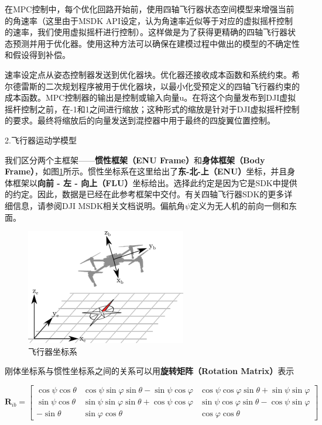 在MPC控制中，每个优化回路开始前，使用四轴飞行器状态空间模型来增强当前的角速率（这里由于MSDK API设定，认为角速率近似等于对应的虚拟摇杆控制的速率，我们使用虚拟摇杆进行控制）。这样做是为了获得更精确的四轴飞行器状态预测并用于优化器。使用这种方法可以确保在建模过程中做出的模型的不确定性和假设得到补偿\cite{ArtE1}。

速率设定点从姿态控制器发送到优化器块。优化器还接收成本函数和系统约束。希尔德雷斯的二次规划程序被用于优化器块，以最小化受预定义的四轴飞行器约束的成本函数。MPC控制器的输出是控制或输入向量u。在将这个向量发布到DJI虚拟摇杆控制之前，在-1和1之间进行缩放；这种形式的缩放是针对于DJI虚拟摇杆控制的要求。最终将缩放后的向量发送到混控器中用于最终的四旋翼位置控制\cite{ArtE9}。

2.飞行器运动学模型

我们区分两个主框架——\textbf{惯性框架（ENU Frame）}和\textbf{身体框架（Body Frame）}，如图\ref{Fig:img-append10}所示。惯性坐标系在这里给出了\textbf{东-北-上（ENU）}坐标，并且身体框架以\textbf{向前 - 左 - 向上（FLU）}坐标给出。选择此约定是因为它是SDK中提供的约定。因此，数据是已经在此参考框架中交付。有关四轴飞行器SDK的更多详细信息，请参阅DJI MSDK相关文档说明。偏航角$\psi$定义为无人机的前向一侧和东面。

\begin{figure}[ht]
  \centering
  \includegraphics[width=0.8\linewidth]{./Figure/Drone_Coordinate_System.png}
  \caption{飞行器坐标系}\label{Fig:img-append10}
\end{figure}

刚体坐标系与惯性坐标系之间的关系可以用\textbf{旋转矩阵（Rotation Matrix）}表示

$$
\boldsymbol{R}_{i b}=\left[\begin{array}{ccc}
\cos \psi \cos \theta & \cos \psi \sin \varphi \sin \theta-\sin \psi \cos \varphi & \cos \psi \cos \varphi \sin \theta+\sin \psi \sin \varphi \\
\sin \psi \cos \theta & \sin \psi \sin \varphi \sin \theta+\cos \psi \cos \varphi & \sin \psi \cos \varphi \sin \theta-\cos \psi \sin \varphi \\
-\sin \theta & \sin \varphi \cos \theta & \cos \varphi \cos \theta
\end{array}\right]
$$

